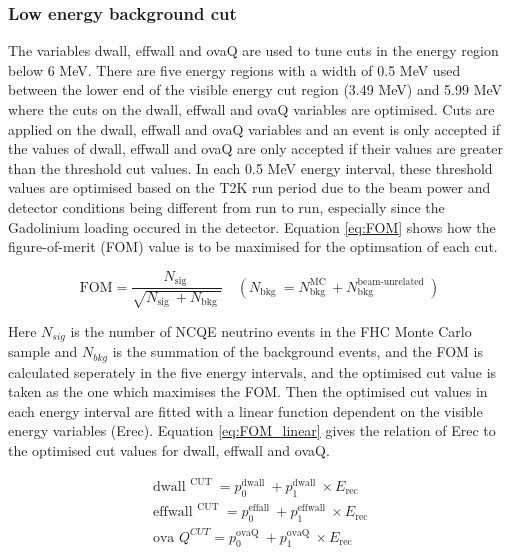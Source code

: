 \subsubsection{Low energy background cut}

The variables dwall, effwall and ovaQ are used to tune cuts in the energy region below 6 MeV. There are five energy regions with a width of 0.5 MeV used between the lower end of the visible energy cut region (3.49 MeV) and 5.99 MeV where the cuts on the dwall, effwall and ovaQ variables are optimised. Cuts are applied on the dwall, effwall and ovaQ variables and an event is only accepted if the values of dwall, effwall and ovaQ are only accepted if their values are greater than the threshold cut values. In each 0.5 MeV energy interval, these threshold values are optimised based on the T2K run period due to the beam power and detector conditions being different from run to run, especially since the Gadolinium loading occured in the detector. Equation \ref{eq:FOM} shows how the figure-of-merit (FOM) value is to be maximised for the optimsation of each cut.

\begin{equation}
    \mathrm{FOM}=\frac{N_{\text {sig }}}{\sqrt{N_{\text {sig }}+N_{\text {bkg }}}} \quad\left(N_{\text {bkg }}=N_{\text {bkg }}^{\mathrm{MC}}+N_{\text {bkg }}^{\text {beam-unrelated }}\right)
\label{eq:FOM}
\end{equation}

Here $N_{sig}$ is the number of NCQE neutrino events in the FHC Monte Carlo sample and $N_{bkg}$ is the summation of the background events, and the FOM is calculated seperately in the five energy intervals, and the optimised cut value is taken as the one which maximises the FOM. Then the optimised cut values in each energy interval are fitted with a linear function dependent on the visible energy variables (Erec). Equation \ref{eq:FOM_linear} gives the relation of Erec to the optimised cut values for dwall, effwall and ovaQ.

\begin{align}
    \text { dwall }^{\text {CUT }} =p_{0}^{\text {dwall }}+p_{1}^{\text {dwall }} \times E_{\text {rec }} \\
    \text { effwall }^{\text {CUT }}=p_{0}^{\text {effall }}+p_{1}^{\text {effwall }} \times E_{\text {rec }} \\
    \text { ova } Q^{C U T}=p_{0}^{\text {ovaQ }}+p_{1}^{\text {ovaQ }} \times E_{\text {rec }}
\label{eq:FOM_linear}
\end{align}


